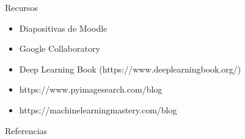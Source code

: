 \begin{frame}{Recursos}
\begin{itemize}
    \item Diapositivas de Moodle
    \item Google Collaboratory
    \item Deep Learning Book (https://www.deeplearningbook.org/)
    \item https://www.pyimagesearch.com/blog
    \item https://machinelearningmastery.com/blog
\end{itemize}
\end{frame}


\begin{frame}[allowframebreaks]{Referencias}
    
    
\end{frame}

